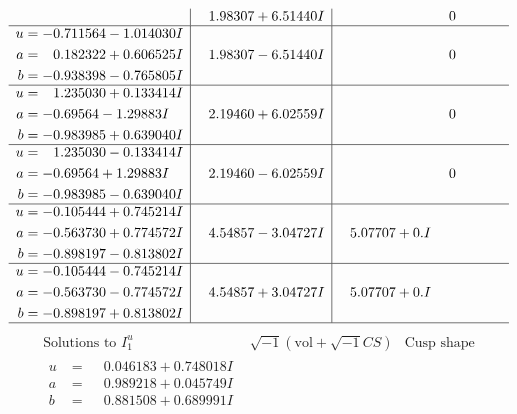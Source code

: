 \documentclass[1p]{elsarticle_modified}
\theoremstyle{definition}
\newcommand{\I}{\sqrt{-1}}
\begin{document}
$$\begin{array}{c|c|c}
 & \phantom{-}1.98307 + 6.51440 I & \phantom{-0.000000 } 0 \\ \hline\begin{aligned}
u &= -0.711564 - 1.014030 I \\
a &= \phantom{-}0.182322 + 0.606525 I \\
b &= -0.938398 - 0.765805 I\end{aligned}
 & \phantom{-}1.98307 - 6.51440 I & \phantom{-0.000000 } 0 \\ \hline\begin{aligned}
u &= \phantom{-}1.235030 + 0.133414 I \\
a &= -0.69564 - 1.29883 I \\
b &= -0.983985 + 0.639040 I\end{aligned}
 & \phantom{-}2.19460 + 6.02559 I & \phantom{-0.000000 } 0 \\ \hline\begin{aligned}
u &= \phantom{-}1.235030 - 0.133414 I \\
a &= -0.69564 + 1.29883 I \\
b &= -0.983985 - 0.639040 I\end{aligned}
 & \phantom{-}2.19460 - 6.02559 I & \phantom{-0.000000 } 0 \\ \hline\begin{aligned}
u &= -0.105444 + 0.745214 I \\
a &= -0.563730 + 0.774572 I \\
b &= -0.898197 - 0.813802 I\end{aligned}
 & \phantom{-}4.54857 - 3.04727 I & \phantom{-}5.07707 + 0. I\phantom{ +0.000000I} \\ \hline\begin{aligned}
u &= -0.105444 - 0.745214 I \\
a &= -0.563730 - 0.774572 I \\
b &= -0.898197 + 0.813802 I\end{aligned}
 & \phantom{-}4.54857 + 3.04727 I & \phantom{-}5.07707 + 0. I\phantom{ +0.000000I}\\
 \hline 
 \end{array}$$\newpage$$\begin{array}{c|c|c}  
\text{Solutions to }I^u_{1}& \I (\text{vol} + \sqrt{-1}CS) & \text{Cusp shape}\\
 \hline 
\begin{aligned}
u &= \phantom{-}0.046183 + 0.748018 I \\
a &= \phantom{-}0.989218 + 0.045749 I \\
b &= \phantom{-}0.881508 + 0.689991 I\end{aligned}

\end{array}$$
\end{document}
